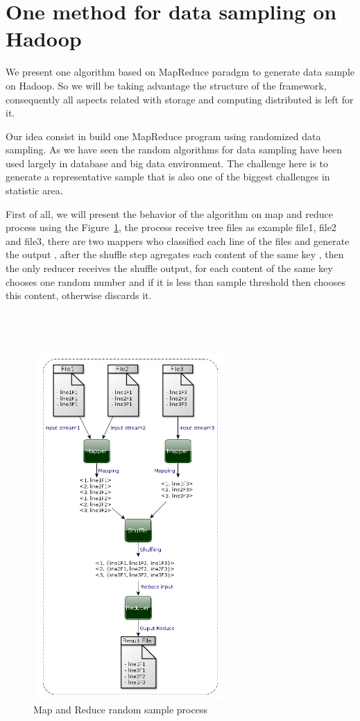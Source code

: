 \section{One method for data sampling on Hadoop}

We present one algorithm based on MapReduce paradgm to generate data sample on Hadoop.
So we will be taking advantage the structure of the framework, consequently all
aspects related with storage and computing distributed is left for it.

Our idea consist in build one MapReduce program using randomized data sampling.
As we have seen the random algorithms for data sampling have been used largely in
database and big data environment. The challenge here is to generate a representative
sample that is also one of the biggest challenges in statistic area.

First of all, we will present the behavior of the algorithm on map and reduce process
using the Figure~\ref{fig:sampleProcess}, the process receive tree files as example
file1, file2 and file3, there are two mappers who classified each line of the files
and generate the output , after the shuffle step
agregates each content of the same key
,
then the only reducer receives the shuffle output, for each content of the same key
chooses one random number and if it is less than sample threshold then chooses this
content, otherwise discards it.
\\
\\
\\
\\
\begin{figure}[htbp]
	\centering
	\includegraphics[width=280px,height=500px]{img/sampleProcess.png}
	\caption{Map and Reduce random sample process}\label{fig:sampleProcess}
\end{figure}

